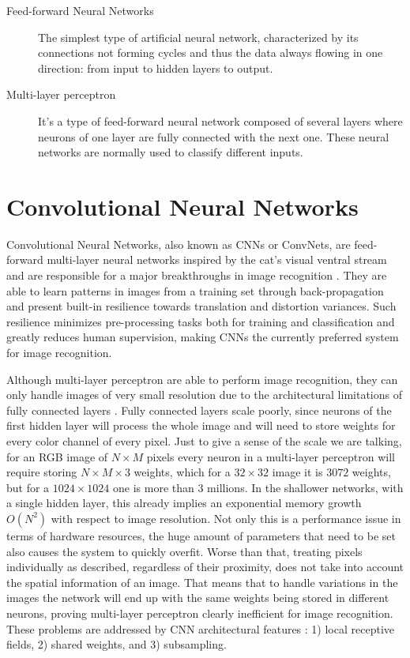 \begin{description}
  \item[Feed-forward Neural Networks]
  The simplest type of artificial neural network, characterized by its connections not forming cycles and thus the data always flowing in one direction: from input to hidden layers to output.

  \item[Multi-layer perceptron]
  It's a type of feed-forward neural network composed of several layers where neurons of one layer are fully connected with the next one.
  These neural networks are normally used to classify different inputs.
\end{description}



\section{Convolutional Neural Networks}
\label{sec:concepts:convolutional-neural-networks}
Convolutional Neural Networks, also known as CNNs or ConvNets, are feed-forward multi-layer neural networks inspired by the cat's visual ventral stream \cite{Hubel1968,Lawrence1997} and are responsible for a major breakthroughs in image recognition \cite{LeCun1995}.
They are able to learn patterns in images from a training set through back-propagation and present built-in resilience towards translation and distortion variances.
Such resilience minimizes pre-processing tasks both for training and classification and greatly reduces human supervision, making CNNs the currently preferred system for image recognition.

Although multi-layer perceptron are able to perform image recognition, they can only handle images of very small resolution due to the architectural limitations of fully connected layers \cite{ZHANG1999}.
Fully connected layers scale poorly, since neurons of the first hidden layer will process the whole image and will need to store weights for every color channel of every pixel.
Just to give a sense of the scale we are talking, for an RGB image of ${N}\times{M}$ pixels every neuron in a multi-layer perceptron will require storing ${N}\times{M}\times{3}$ weights, which for a ${32}\times{32}$ image it is $3072$ weights, but for a ${1024}\times{1024}$ one is more than $3$ millions.
In the shallower networks, with a single hidden layer, this already implies an exponential memory growth $O(N^2)$ with respect to image resolution.
Not only this is a performance issue in terms of hardware resources, the huge amount of parameters that need to be set also causes the system to quickly overfit.
Worse than that, treating pixels individually as described, regardless of their proximity, does not take into account the spatial information of an image.
That means that to handle variations in the images the network will end up with the same weights being stored in different neurons, proving multi-layer perceptron clearly inefficient for image recognition.
These problems are addressed by CNN architectural features \cite{LeCun1998}: 1) local receptive fields, 2) shared weights, and 3) subsampling.

